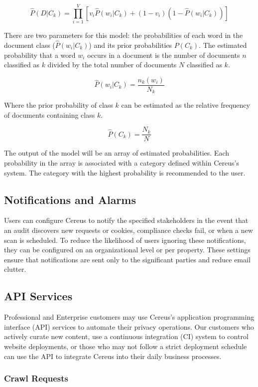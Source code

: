 \[
  \hat{P}(D|C_{k}) = \prod_{i=1}^{V}[v_{i}\hat{P}(w_{i}|C_{k}) + (1 - v_{i})(1 - \hat{P}(w_{i}|C_{k}))]
\]

There are two parameters for this model: the probabilities of each word in the document class (\(\hat{P}(w_{i}|C_{k})\)) and its prior probabilities \(P(C_{k})\). The estimated probability that a word \(w_{i}\) occurs in a document is the number of documents \(n\) classified as \(k\) divided by the total number of documents \(N\) classified as \(k\).

\[
  \hat{P}(w_{i}|C_{k}) = \frac{n_{k}(w_{i})}{N_{k}}
\]

Where the prior probability of class \(k\) can be estimated as the relative frequency of documents containing class \(k\).

\[
  \hat{P}(C_{k}) = \frac{N_{k}}{N}
\]

The output of the model will be an array of estimated probabilities. Each probability in the array is associated with a category defined within Cereus's system. The category with the highest probability is recommended to the user.

\subsection{Notifications and Alarms}

Users can configure Cereus to notify the specified stakeholders in the event that an audit discovers new requests or cookies, compliance checks fail, or when a new scan is scheduled. To reduce the likelihood of users ignoring these notifications, they can be configured on an organizational level or per property. These settings ensure that notifications are sent only to the significant parties and reduce email clutter.

\subsection{API Services}

Professional and Enterprise customers may use Cereus's application programming interface (API) services to automate their privacy operations. Our customers who actively curate new content, use a continuous integration (CI) system to control website deployments, or those who may not follow a strict deployment schedule can use the API to integrate Cereus into their daily business processes.

\subsubsection*{Crawl Requests}

